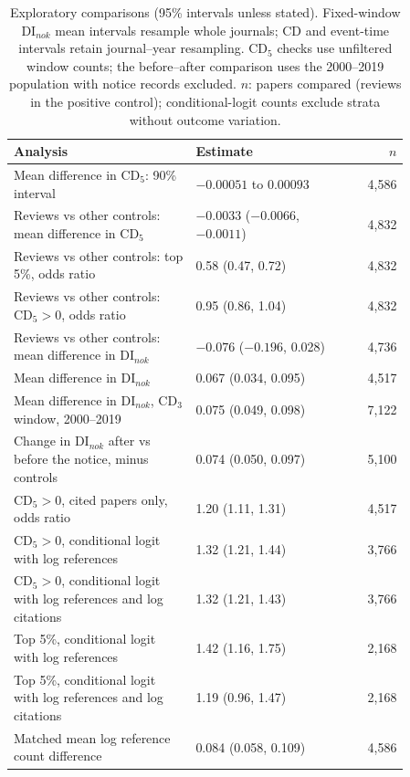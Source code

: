 \begin{table}[!htbp]
\centering
\caption{Exploratory comparisons (95\% intervals unless stated). Fixed-window DI$_{nok}$ mean intervals resample
whole journals; CD and event-time intervals retain journal--year resampling.
CD$_5$ checks use unfiltered
window counts; the before--after comparison uses the 2000--2019 population with notice records excluded.
$n$: papers compared (reviews in the positive control); conditional-logit counts exclude strata without outcome variation.}
\label{tab:posthoc}
\small
\begin{tabular}{@{}>{\raggedright\arraybackslash}p{0.46\linewidth}p{0.40\linewidth}r@{}}
\toprule
Analysis & Estimate & $n$ \\
\midrule
Mean difference in CD$_5$: 90\% interval & $-0.00051$ to $0.00093$ & 4,586 \\
Reviews vs other controls: mean difference in CD$_5$ & $-0.0033$ ($-0.0066$, $-0.0011$) & 4,832 \\
Reviews vs other controls: top 5\%, odds ratio & 0.58 (0.47, 0.72) & 4,832 \\
Reviews vs other controls: CD$_5>0$, odds ratio & 0.95 (0.86, 1.04) & 4,832 \\
Reviews vs other controls: mean difference in DI$_{nok}$ & $-0.076$ ($-0.196$, 0.028) & 4,736 \\
Mean difference in DI$_{nok}$ & 0.067 (0.034, 0.095) & 4,517 \\
Mean difference in DI$_{nok}$, CD$_3$ window, 2000--2019 & 0.075 (0.049, 0.098) & 7,122 \\
Change in DI$_{nok}$ after vs before the notice, minus controls & 0.074 (0.050, 0.097) & 5,100 \\
CD$_5 > 0$, cited papers only, odds ratio & 1.20 (1.11, 1.31) & 4,517 \\
CD$_5 > 0$, conditional logit with log references & 1.32 (1.21, 1.44) & 3,766 \\
CD$_5 > 0$, conditional logit with log references and log citations & 1.32 (1.21, 1.43) & 3,766 \\
Top 5\%, conditional logit with log references & 1.42 (1.16, 1.75) & 2,168 \\
Top 5\%, conditional logit with log references and log citations & 1.19 (0.96, 1.47) & 2,168 \\
Matched mean log reference count difference & 0.084 (0.058, 0.109) & 4,586 \\
\bottomrule
\end{tabular}
\end{table}
